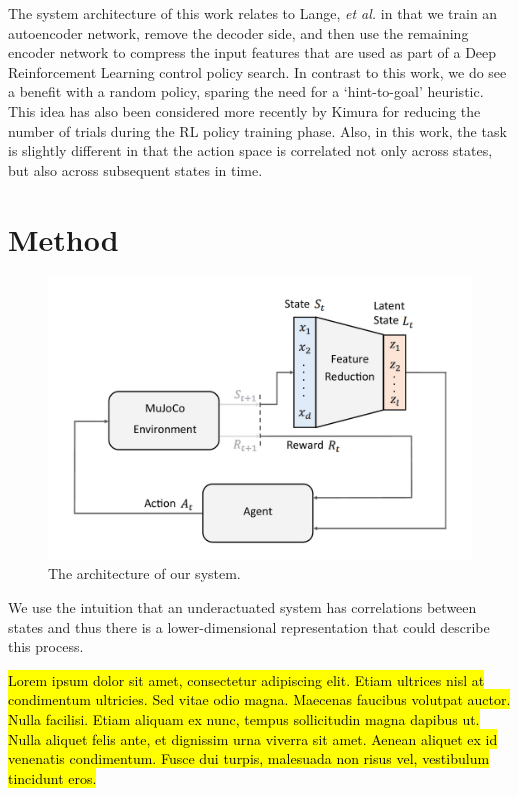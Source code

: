 \documentclass[letterpaper, 10 pt, conference]{ieeeconf}
\begin{document}
The system architecture of this work relates to Lange, \emph{et al.} \cite{lange2010deep} in that we train an autoencoder network, remove the decoder side, and then use the remaining encoder network to compress the input features that are used as part of a Deep Reinforcement Learning control policy search.  In contrast to this work, we do see a benefit with a random policy, sparing the need for a `hint-to-goal' heuristic.  This idea has also been considered more recently by Kimura \cite{kimura2018daqn} for reducing the number of trials during the RL policy training phase.   
Also, in this work, the task is slightly different in that the action space is correlated not only across states, but also across subsequent states in time.  

\section{Method}

\begin{figure}[t]
    \centering
    \includegraphics[width=\linewidth]{fig-system-arch}
    \caption{
        The architecture of our system.
    }
    \label{fig:system-arch}
\end{figure}

We use the intuition that an underactuated system has correlations between states %
and thus there is a lower-dimensional representation that could describe this process. 

\hl{Lorem ipsum dolor sit amet, consectetur adipiscing elit. Etiam ultrices nisl at condimentum ultricies. Sed vitae odio magna. Maecenas faucibus volutpat auctor. Nulla facilisi. Etiam aliquam ex nunc, tempus sollicitudin magna dapibus ut. Nulla aliquet felis ante, et dignissim urna viverra sit amet. Aenean aliquet ex id venenatis condimentum. Fusce dui turpis, malesuada non risus vel, vestibulum tincidunt eros.}
\end{document}
